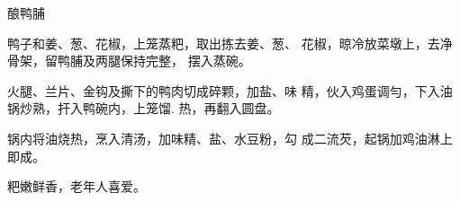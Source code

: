 \begin{recipe}{酿鸭脯}

\ingredients


\cooking

\step 	鸭子和姜、葱、花椒，上笼蒸粑，取出拣去姜、葱、 花椒，晾冷放菜墩上，去净骨架，留鸭脯及两腿保持完整， 摆入蒸碗。

\step 	火腿、兰片、金钩及撕下的鸭肉切成碎颗，加盐、味 精，伙入鸡蛋调勻，下入油锅炒熟，扞入鸭碗内，上笼馏. 热，再翻入圆盘。

\step 锅内将油烧热，烹入清汤，加味精、盐、水豆粉，勾 成二流芡，起锅加鸡油淋上即成。

\notes

粑嫩鲜香，老年人喜爱。

\end{recipe}

